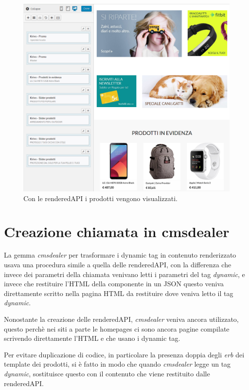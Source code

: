 \begin{figure}
  \includegraphics[width=\textwidth]{figure/livedit.png}
  \caption{Con le renderedAPI i prodotti vengono visualizzati.}
  \label{fig:kspec}
\end{figure}

\newpage
\section{Creazione chiamata in cmsdealer}

La gemma \emph{cmsdealer} per trasformare i dynamic tag in contenuto renderizzato usava una procedura simile 
a quella delle renderedAPI, con la differenza che invece dei parametri della chiamata venivano letti i parametri
del tag \emph{dynamic}, e invece che restituire l'HTML della componente in un JSON questo veniva direttamente
scritto nella pagina HTML da restituire dove veniva letto il tag \emph{dynamic}.

Nonostante la creazione delle renderedAPI, \emph{cmsdealer} veniva ancora utilizzato,
questo perchè nei siti a parte le homepages ci sono ancora pagine compilate scrivendo direttamente l'HTML
e che usano i dynamic tag.

Per evitare duplicazione di codice, in particolare la presenza doppia degli \emph{erb} dei template dei prodotti,
si è fatto in modo che quando \emph{cmsdealer} legge un tag \emph{dynamic}, sostituisce questo con il contenuto
che viene restituito dalle renderedAPI.

